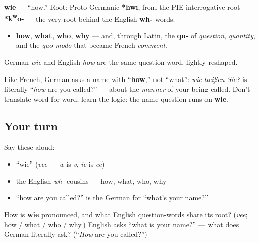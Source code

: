 \begin{cousinweb}
\textbf{wie} — \textquotedblleft{}how.\textquotedblright{} Root: Proto-Germanic \textbf{*hwī}, from the PIE interrogative root \textbf{*k\textsuperscript{w}o-} — the very root behind the English \textbf{wh-} words:

\begin{itemize}
\raggedright
  \item \textbf{how}, \textbf{what}, \textbf{who}, \textbf{why} — and, through Latin, the \textbf{qu-} of \emph{question}, \emph{quantity}, and the \emph{quo modo} that became French \emph{comment}.
\end{itemize}

German \emph{wie} and English \emph{how} are the same question-word, lightly reshaped.
\end{cousinweb}

\begin{grammarlens}[title={Grammar Lens: German counts names as a matter of \textquotedblleft{}how\textquotedblright{}}]
Like French, German asks a name with \textquotedblleft{}\textbf{how},\textquotedblright{} not \textquotedblleft{}what\textquotedblright{}: \emph{wie heißen Sie?} is literally \textquotedblleft{}\emph{how} are you called?\textquotedblright{} — about the \emph{manner} of your being called. Don't translate word for word; learn the logic: the name-question runs on \textbf{wie}.
\end{grammarlens}

\subsection*{Your turn}
Say these aloud:

\begin{itemize}
\raggedright
  \item \textquotedblleft{}wie\textquotedblright{} (\emph{vee} — \emph{w} is \emph{v}, \emph{ie} is \emph{ee})
  \item the English \emph{wh-} cousins — how, what, who, why
  \item \textquotedblleft{}how are you called?\textquotedblright{} is the German for \textquotedblleft{}what's your name?\textquotedblright{}
\end{itemize}

\begin{tcolorbox}[breakable,colback=teal!4,colframe=teal!35!black,title={Before you move on}]
How is \textbf{wie} pronounced, and what English question-words share its root? (\emph{vee}; how / what / who / why.) English asks \textquotedblleft{}what is your name?\textquotedblright{} — what does German literally ask? (\textquotedblleft{}\emph{How} are you called?\textquotedblright{})
\end{tcolorbox}
